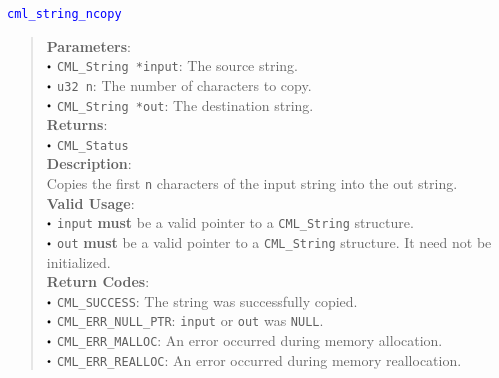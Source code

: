 \documentclass[a4paper,oneside,8pt]{extarticle}
\newcommand{\function}[1]{
  \noindent\textcolor{blue}{\texttt{#1}}
  \vspace{-0.3em}
}
\renewcommand{\dot}{\raisebox{0.3ex}{\scalebox{0.6}{$\bullet$}}}
\theoremstyle{definition}
\begin{document}
\function{cml\_string\_ncopy}
\begin{quote}
  \textbf{Parameters}: \\
  $\dot$ \texttt{CML\_String *input}: The source string. \\
  $\dot$ \texttt{u32 n}: The number of characters to copy. \\
  $\dot$ \texttt{CML\_String *out}: The destination string. \\
  \textbf{Returns}: \\
  $\dot$ \texttt{CML\_Status} \\
  
  \vspace{-0.75em}
  \textbf{Description}: \\
  Copies the first \texttt{n} characters of the input string into the out string. \\

  \vspace{-0.75em}
  \textbf{Valid Usage}: \\
  $\dot$ \texttt{input} \textbf{must} be a valid pointer to a \texttt{CML\_String} structure. \\
  $\dot$ \texttt{out} \textbf{must} be a valid pointer to a \texttt{CML\_String} structure. It need not be initialized. \\

  \vspace{-0.75em}
  \textbf{Return Codes}: \\
  $\dot$ \texttt{CML\_SUCCESS}: The string was successfully copied. \\
  $\dot$ \texttt{CML\_ERR\_NULL\_PTR}: \texttt{input} or \texttt{out} was \texttt{NULL}. \\
  $\dot$ \texttt{CML\_ERR\_MALLOC}: An error occurred during memory allocation. \\
  $\dot$ \texttt{CML\_ERR\_REALLOC}: An error occurred during memory reallocation. \\
\end{quote}
\end{document}
